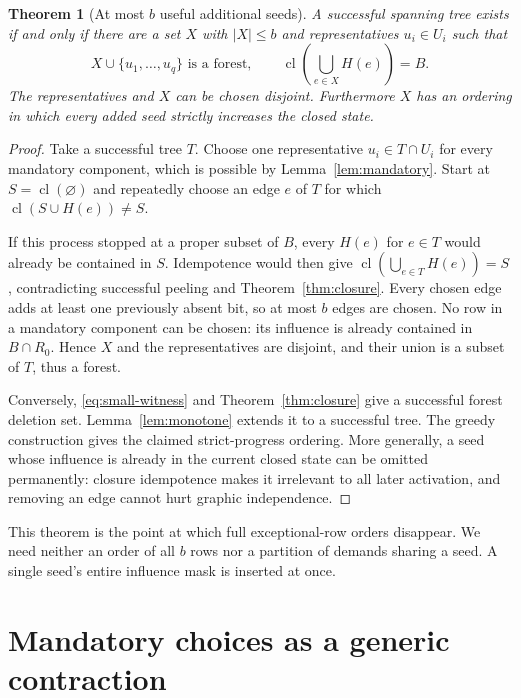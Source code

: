 \documentclass[11pt,letterpaper]{article}
\newtheorem{theorem}{Theorem}[section]
\theoremstyle{definition}
\newcommand{\cl}{\operatorname{cl}}
\begin{document}
\begin{theorem}[At most $b$ useful additional seeds]\label{thm:few-seeds}
A successful spanning tree exists if and only if there are a set $X$ with
$|X|\leq b$ and representatives $u_i\in U_i$ such that
\begin{equation}\label{eq:small-witness}
 X\cup\{u_1,\ldots,u_q\}\text{ is a forest},\qquad
 \cl\left(\bigcup_{e\in X}H(e)\right)=B.
\end{equation}
The representatives and $X$ can be chosen disjoint. Furthermore $X$ has an
ordering in which every added seed strictly increases the closed state.
\end{theorem}
\begin{proof}
Take a successful tree $T$. Choose one representative $u_i\in T\cap U_i$
for every mandatory component, which is possible by
Lemma~\ref{lem:mandatory}. Start at $S=\cl(\varnothing)$ and repeatedly
choose an edge $e$ of $T$ for which $\cl(S\cup H(e))\ne S$.

If this process stopped at a proper subset of $B$, every $H(e)$ for $e\in T$
would already be contained in $S$. Idempotence would then give
$\cl(\bigcup_{e\in T}H(e))=S$, contradicting successful peeling and
Theorem~\ref{thm:closure}. Every chosen edge adds at least one previously
absent bit, so at most $b$ edges are chosen. No row in a mandatory component
can be chosen: its influence is already contained in $B\cap R_0$. Hence
$X$ and the representatives are disjoint, and their union is a subset of
$T$, thus a forest.

Conversely, \eqref{eq:small-witness} and Theorem~\ref{thm:closure} give a
successful forest deletion set. Lemma~\ref{lem:monotone} extends it to a
successful tree. The greedy construction gives the claimed strict-progress
ordering. More generally, a seed whose influence is already in the current
closed state can be omitted permanently: closure idempotence makes it
irrelevant to all later activation, and removing an edge cannot hurt graphic
independence.
\end{proof}

This theorem is the point at which full exceptional-row orders disappear.
We need neither an order of all $b$ rows nor a partition of demands sharing a
seed. A single seed's entire influence mask is inserted at once.

\section{Mandatory choices as a generic contraction}\label{sec:generic}
\end{document}
